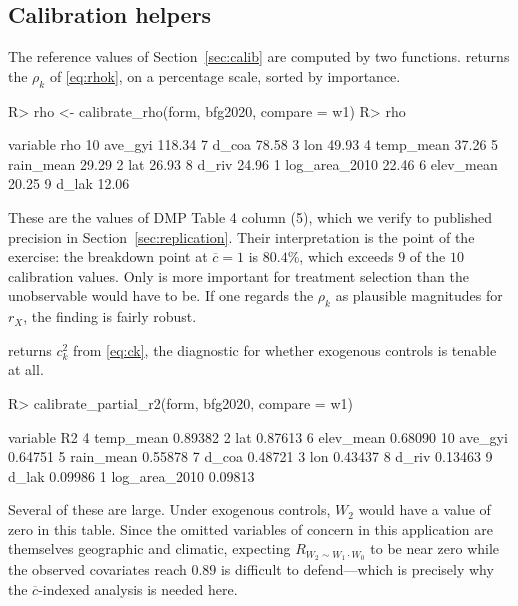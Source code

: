 \documentclass[article]{jss}\usepackage[]{graphicx}\usepackage[]{xcolor}
\newcommand{\cbar}{\ensuremath{\overline{c}}}
\begin{document}
\subsection{Calibration helpers}\label{sec:api-calib}

The reference values of Section~\ref{sec:calib} are computed by two
functions.  returns the $\rho_k$ of
\eqref{eq:rhok}, on a percentage scale, sorted by importance.

\begin{Schunk}
\begin{Sinput}
R> rho <- calibrate_rho(form, bfg2020, compare = w1)
R> rho
\end{Sinput}
\begin{Soutput}
        variable    rho
10       ave_gyi 118.34
7          d_coa  78.58
3            lon  49.93
4      temp_mean  37.26
5      rain_mean  29.29
2            lat  26.93
8          d_riv  24.96
1  log_area_2010  22.46
6      elev_mean  20.25
9          d_lak  12.06
\end{Soutput}
\end{Schunk}

These are the values of DMP Table 4 column (5), which we verify to
published precision in Section~\ref{sec:replication}. Their interpretation
is the point of the exercise: the breakdown point at $\cbar = 1$ is
$80.4$\%, which exceeds
$9$ of the
$10$ calibration values. Only  is more
important for treatment selection than the unobservable would have to
be. If one regards the $\rho_k$ as plausible magnitudes for $r_X$, the
finding is fairly robust.

 returns $c_k^2$ from \eqref{eq:ck}, the
diagnostic for whether exogenous controls is tenable at all.

\begin{Schunk}
\begin{Sinput}
R> calibrate_partial_r2(form, bfg2020, compare = w1)
\end{Sinput}
\begin{Soutput}
        variable      R2
4      temp_mean 0.89382
2            lat 0.87613
6      elev_mean 0.68090
10       ave_gyi 0.64751
5      rain_mean 0.55878
7          d_coa 0.48721
3            lon 0.43437
8          d_riv 0.13463
9          d_lak 0.09986
1  log_area_2010 0.09813
\end{Soutput}
\end{Schunk}

Several of these are large. Under exogenous controls, $W_2$ would have a
value of zero in this table. Since the omitted variables of concern in this
application are themselves geographic and climatic, expecting
$R_{W_2 \sim W_1 \cdot W_0}$ to be near zero while the observed covariates
reach $0.89$ is difficult to defend---which is precisely why the
$\cbar$-indexed analysis is needed here.
\end{document}
